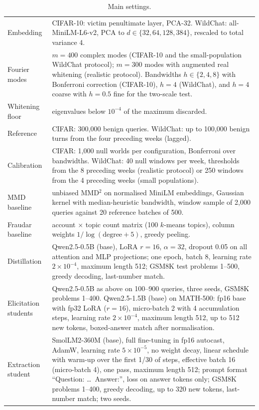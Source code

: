 \begin{table}[ht]
\centering
\caption{Main settings.}
\small
\begin{tabular}{p{}p{}}
\toprule
Embedding & CIFAR-10: victim penultimate layer, PCA-32. WildChat: all-MiniLM-L6-v2, PCA to $d\in\{32,64,128,384\}$, rescaled to total variance 4. \\
Fourier modes & $m=400$ complex modes (CIFAR-10 and the small-population WildChat protocol); $m=300$ modes with augmented real whitening (realistic protocol). Bandwidths $h\in\{2,4,8\}$ with Bonferroni correction (CIFAR-10), $h=4$ (WildChat), and $h=4$ coarse with $h=0.5$ fine for the two-scale test. \\
Whitening floor & eigenvalues below $10^{-4}$ of the maximum discarded. \\
Reference & CIFAR: 300{,}000 benign queries. WildChat: up to 100{,}000 benign turns from the four preceding weeks (lagged). \\
Calibration & CIFAR: 1{,}000 null worlds per configuration, Bonferroni over bandwidths. WildChat: 40 null windows per week, thresholds from the 8 preceding weeks (realistic protocol) or 250 windows from the 4 preceding weeks (small populations). \\
MMD baseline & unbiased MMD$^2$ on normalised MiniLM embeddings, Gaussian kernel with median-heuristic bandwidth, window sample of 2{,}000 queries against 20 reference batches of 500. \\
Fraudar baseline & account $\times$ topic count matrix (100 $k$-means topics), column weights $1/\log(\text{degree}+5)$, greedy peeling. \\
Distillation & Qwen2.5-0.5B (base), LoRA $r=16$, $\alpha=32$, dropout 0.05 on all attention and MLP projections; one epoch, batch 8, learning rate $2\times10^{-4}$, maximum length 512; GSM8K test problems 1--500, greedy decoding, last-number match. \\
Elicitation students & Qwen2.5-0.5B as above on 100--900 queries, three seeds, GSM8K problems 1--400. Qwen2.5-1.5B (base) on MATH-500: fp16 base with fp32 LoRA ($r=16$), micro-batch 2 with 4 accumulation steps, learning rate $2\times10^{-4}$, maximum length 512, up to 512 new tokens, boxed-answer match after normalisation. \\
Extraction student & SmolLM2-360M (base), full fine-tuning in fp16 autocast, AdamW, learning rate $5\times10^{-5}$, no weight decay, linear schedule with warm-up over the first 1/30 of steps, effective batch 16 (micro-batch 4), one pass, maximum length 512; prompt format ``Question: \ldots\ Answer:'', loss on answer tokens only; GSM8K problems 1--400, greedy decoding, up to 320 new tokens, last-number match; two seeds. \\

\end{tabular}
\end{table}
